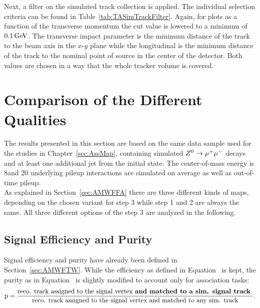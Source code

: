 

Next, a filter on the simulated track collection is applied. The individual selection criteria can be found in Table~\ref{tab:TASimTrackFilter}. Again, for plots as a function of the transverse momentum the cut value is lowered to a minimum \pt{} of $0.1\,\text{Ge\hspace{-.08em}V}$. The transverse impact parameter is the minimum distance of the track to the beam axis in the $x$-$y$ plane while the longitudinal is the minimum distance of the track to the nominal point of source in the center of the detector. Both values are chosen in a way that the whole tracker volume is covered.



\section{Comparison of the Different Qualities \label{sec:TASEFRDQ}}

The results presented in this section are based on the same data sample used for the studies in Chapter~\ref{sec:AssMap}, containing simulated ${Z^{0}}\rightarrow\mu^+\mu^-$ decays and at least one additional jet from the initial state. The center-of-mass energy is 8\TeV and 20 underlying pileup interactions are simulated on average as well as out-of-time pileup. \\
As explained in Section~\ref{sec:AMWFFA} there are three different kinds of maps, depending on the chosen variant for step 3 while step 1 and 2 are always the same. All three different options of the step 3 are analyzed in the following.

\subsection{Signal Efficiency and Purity \label{sec:TASEFR}}

Signal efficiency and purity have already been defined in Section~\ref{sec:AMWFTW}. While the efficiency as defined in Equation~ is kept, the purity as in Equation~ is slightly modified to account only for association tasks:
\begin{equation}
    \textrm{p} = \frac{ \textrm{reco. track assigned to the signal vertex \textbf{and matched to a sim. signal track} } }{ \textrm{reco. track assigned to the signal vertex and matched to any sim. track} }.
    \label{eq:AssPurity}
\end{equation}

